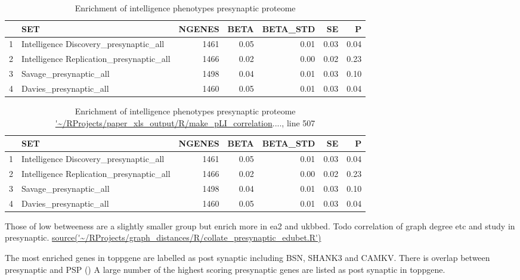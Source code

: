 \begin{table}[ht]
\centering
\begin{tabular}{rlrrrrr}
  \hline
 & SET & NGENES & BETA & BETA\_STD & SE & P \\ 
  \hline
1 & Intelligence Discovery\_presynaptic\_all & 1461 & 0.05 & 0.01 & 0.03 & 0.04 \\ 
  2 & Intelligence Replication\_presynaptic\_all & 1466 & 0.02 & 0.00 & 0.02 & 0.23 \\ 
  3 & Savage\_presynaptic\_all & 1498 & 0.04 & 0.01 & 0.03 & 0.10 \\ 
  4 & Davies\_presynaptic\_all & 1460 & 0.05 & 0.01 & 0.03 & 0.04 \\ 
   \hline
\end{tabular}
\caption{Enrichment of intelligence phenotypes presynaptic proteome} 
\label{Table:Enrichment of intelligence phenotypes presynaptic proteome}
\end{table}

\begin{table}[ht]
\centering
\begin{tabular}{rlrrrrr}
  \hline
 & SET & NGENES & BETA & BETA\_STD & SE & P \\ 
  \hline 

1 & Intelligence Discovery\_presynaptic\_all & 1461 & 0.05 & 0.01 & 0.03 & 0.04 \\ 
  2 & Intelligence Replication\_presynaptic\_all & 1466 & 0.02 & 0.00 & 0.02 & 0.23 \\ 
  3 & Savage\_presynaptic\_all & 1498 & 0.04 & 0.01 & 0.03 & 0.10 \\ 
  4 & Davies\_presynaptic\_all & 1460 & 0.05 & 0.01 & 0.03 & 0.04 \\ 
   \hline
\end{tabular}
\caption{Enrichment of intelligence phenotypes presynaptic proteome \url{'~/RProjects/paper_xls_output/R/make_pLI_correlation}...., line 507} 
\label{Table:Enrichment of intelligence phenotypes presynaptic proteome}
\end{table}

Those of low betweeness are a slightly smaller group but enrich more in ea2 and ukbbed. Todo correlation of graph degree etc and study in presynaptic. \url{source('~/RProjects/graph_distances/R/collate_presynaptic_edubet.R')}
 

The most enriched genes in toppgene are labelled as post synaptic including BSN, SHANK3 and CAMKV. There is overlap between presynaptic and PSP () A large number of the highest scoring presynaptic genes are listed as post synaptic in toppgene. 

